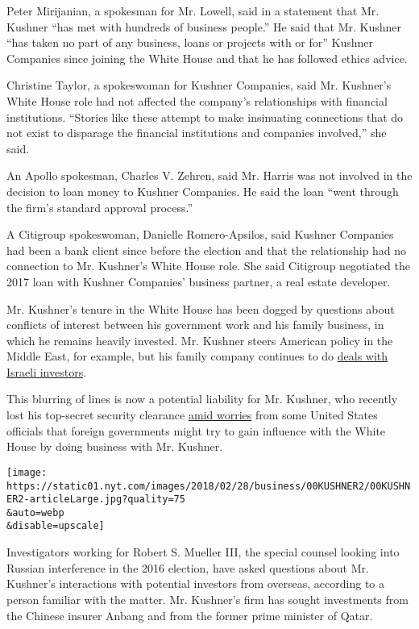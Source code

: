 Peter Mirijanian, a spokesman for Mr. Lowell, said in a statement that
Mr. Kushner ``has met with hundreds of business people.'' He said that
Mr. Kushner ``has taken no part of any business, loans or projects with
or for'' Kushner Companies since joining the White House and that he has
followed ethics advice.

Christine Taylor, a spokeswoman for Kushner Companies, said Mr.
Kushner's White House role had not affected the company's relationships
with financial institutions. ``Stories like these attempt to make
insinuating connections that do not exist to disparage the financial
institutions and companies involved,'' she said.

An Apollo spokesman, Charles V. Zehren, said Mr. Harris was not involved
in the decision to loan money to Kushner Companies. He said the loan
``went through the firm's standard approval process.''

A Citigroup spokeswoman, Danielle Romero-Apsilos, said Kushner Companies
had been a bank client since before the election and that the
relationship had no connection to Mr. Kushner's White House role. She
said Citigroup negotiated the 2017 loan with Kushner Companies' business
partner, a real estate developer.

Mr. Kushner's tenure in the White House has been dogged by questions
about conflicts of interest between his government work and his family
business, in which he remains heavily invested. Mr. Kushner steers
American policy in the Middle East, for example, but his family company
continues to do
\href{https://www.nytimes.com/2018/01/07/business/jared-kushner-israel.html}{deals
with Israeli investors}.

This blurring of lines is now a potential liability for Mr. Kushner, who
recently lost his top-secret security clearance
\href{https://www.nytimes.com/2018/02/27/us/politics/jared-kushner-security-clearance-trump.html}{amid
worries} from some United States officials that foreign governments
might try to gain influence with the White House by doing business with
Mr. Kushner.

\texttt{[image: https://static01.nyt.com/images/2018/02/28/business/00KUSHNER2/00KUSHNER2-articleLarge.jpg?quality=75\\\&auto=webp\\\&disable=upscale]}

Investigators working for Robert S. Mueller III, the special counsel
looking into Russian interference in the 2016 election, have asked
questions about Mr. Kushner's interactions with potential investors from
overseas, according to a person familiar with the matter. Mr. Kushner's
firm has sought investments from the Chinese insurer Anbang and from the
former prime minister of Qatar.

